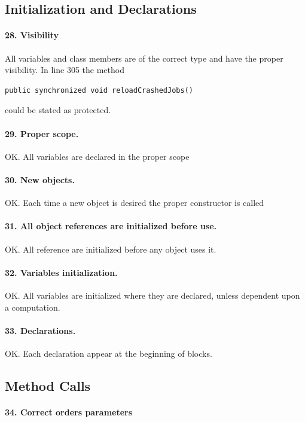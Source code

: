 \documentclass[english]{article}
\begin{document}
\subsection{Initialization and Declarations}

\paragraph{28. Visibility}
All variables and class members are of the correct type and have the proper visibility.
In line 305 the method 
\begin{lstlisting} 
public synchronized void reloadCrashedJobs()
\end{lstlisting} 
could be stated as protected.

\paragraph{29. Proper scope.} 
OK. All variables are declared in the proper scope

\paragraph{30. New objects.} 
OK. Each time a new object is desired the proper constructor is called

\paragraph{31. All object references are initialized before use.} 
OK. All reference are initialized before any object uses it. 

\paragraph{32. Variables initialization.} 
OK. All variables are initialized where they are declared, unless dependent upon a computation.

\paragraph{33. Declarations.} OK. Each declaration appear at the beginning of blocks.

\subsection{Method Calls}

\paragraph{34. Correct orders parameters}
\end{document}
